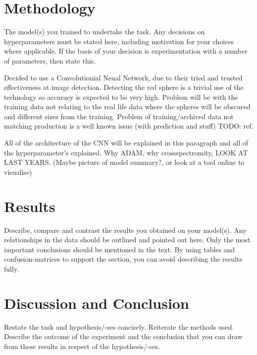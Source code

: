 \documentclass{article}
\begin{document}
\section{Methodology}
The model(s) you trained to undertake the task. Any decisions
on hyperparameters must be stated here, including motivation for your
choices where applicable. If the basis of your decision is experimentation
with a number of parameters, then state this.

Decided to use a Convolutionial Neual Network, due to their tried and trusted effectiveness at image detection.
Detecting the red sphere is a trivial use of the technology so accuracy is expected to be very high.
Problem will be with the training data not relating to the real life data where the spheres will be obscured and different sizes from the training.
Problem of training/archived data not matching production is a well known issue (with prediction and stuff) TODO: ref.

All of the architecture of the CNN will be explained in this paragraph and all of the hyperparameter's explained.
Why ADAM, why crossspectromity, LOOK AT LAST YEARS.
(Maybe picture of model summary?, or look at a tool online to visualise)

\section{Results}
Describe, compare and contrast the results you obtained on your
model(s). Any relationships in the data should be outlined and pointed
out here. Only the most important conclusions should be mentioned in
the text. By using tables and confusion-matrices to support the section,
you can avoid describing the results fully.

\section{Discussion and Conclusion}
Restate the task and hypothesis/-ses concisely.
Reiterate the methods used. Describe the outcome of the experiment
and the conclusion that you can draw from these results in respect of the
hypothesis/-ses.

\printbibliography
\end{document}
